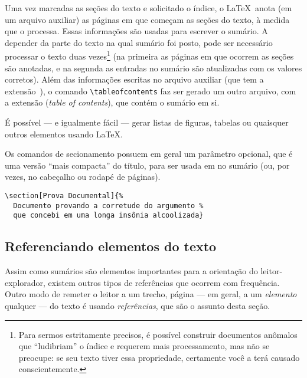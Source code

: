 Uma vez marcadas as seções do texto e solicitado o índice, o
\LaTeX\ anota (em um arquivo auxiliar) as páginas em que começam as
seções do texto, à medida que o processa. Essas informações
são usadas para escrever o sumário. A depender da parte do
texto na qual sumário foi posto, pode ser necessário processar o texto duas vezes\footnote{Para sermos estritamente precisos, é possível construir documentos anômalos que ``ludibriam'' o índice e requerem mais processamento, mas não se preocupe: se seu texto tiver essa propriedade, certamente você a terá causado conscientemente.} (na primeira as páginas em que ocorrem as seções são anotadas, e
na segunda as entradas no sumário são atualizadas com os valores
corretos).
Além das informações escritas no arquivo auxiliar (que tem a
extensão~), o comando \verb'\tableofcontents' faz ser
gerado um outro arquivo, com a extensão  (\emph{table of
  contents}), que contém o sumário em si. 

É possível --- e igualmente fácil --- gerar listas de figuras, tabelas
ou quaisquer outros elementos usando \LaTeX. 


Os comandos de secionamento possuem em geral um parâmetro opcional,
que é uma versão ``mais compacta'' do título, para ser usada em no
sumário (ou, por vezes, no cabeçalho ou rodapé de páginas).
\begin{footnotesize}
\begin{verbatim}
\section[Prova Documental]{%
  Documento provando a corretude do argumento %
  que concebi em uma longa insônia alcoolizada}
\end{verbatim}
\end{footnotesize}


\subsection{Referenciando elementos do texto}\label{sec:ref-e-label}

Assim como sumários são elementos importantes para a orientação do leitor-explorador, existem outros tipos de referências que ocorrem com frequência. Outro modo de remeter o leitor a um trecho, página --- em geral, a um \emph{elemento} qualquer --- do texto é usando \emph{referências}, que são o assunto desta seção.


